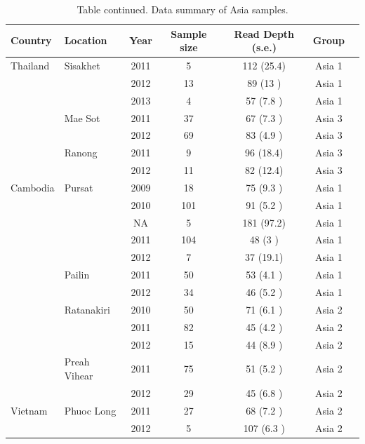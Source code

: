 \documentclass[9pt,lineno]{elife}
\begin{document}
\begin{table}[bt]
\ContinuedFloat
\caption{Table continued. Data summary of Asia samples.}
\begin{tabular}{l l c c c c c}
\toprule
Country & Location & Year & Sample size & Read Depth (s.e.) & Group \\
\midrule
Thailand        &Sisakhet       &2011 &5    &112  (25.4)&Asia 1  \\
                &               &2012 &13   &89   (13  )&Asia 1  \\
                &               &2013 &4    &57   (7.8 )&Asia 1  \\
                &Mae Sot        &2011 &37   &67   (7.3 )&Asia 3  \\
                &               &2012 &69   &83   (4.9 )&Asia 3  \\
                &Ranong         &2011 &9    &96   (18.4)&Asia 3  \\
                &               &2012 &11   &82   (12.4)&Asia 3  \\
 \hline
Cambodia        &Pursat         &2009 &18   &75   (9.3 )&Asia 1  \\
                &               &2010 &101  &91   (5.2 )&Asia 1  \\
                &               &NA   &5    &181  (97.2)&Asia 1  \\
                &               &2011 &104  &48   (3   )&Asia 1  \\
                &               &2012 &7    &37   (19.1)&Asia 1  \\
                &Pailin         &2011 &50   &53   (4.1 )&Asia 1  \\
                &               &2012 &34   &46   (5.2 )&Asia 1  \\
                &Ratanakiri     &2010 &50   &71   (6.1 )&Asia 2  \\
                &               &2011 &82   &45   (4.2 )&Asia 2  \\
                &               &2012 &15   &44   (8.9 )&Asia 2  \\
                &Preah Vihear   &2011 &75   &51   (5.2 )&Asia 2  \\
                &               &2012 &29   &45   (6.8 )&Asia 2  \\
 \hline
Vietnam         &Phuoc Long     &2011 &27   &68   (7.2 )&Asia 2  \\
                &               &2012 &5    &107  (6.3 )&Asia 2  \\

\end{tabular}
\end{table}
\end{document}
